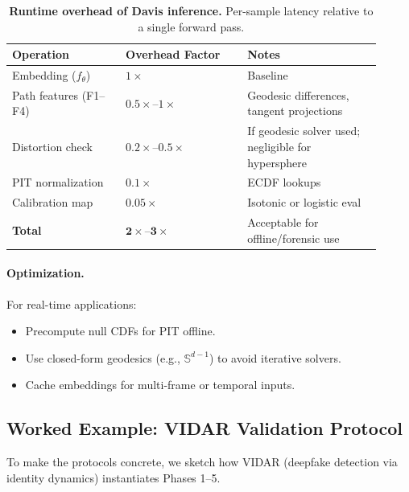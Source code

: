 \documentclass[11pt]{article}
\theoremstyle{remark}
\theoremstyle{plain}
\begin{document}
\begin{table}[H]
\centering
\caption{\textbf{Runtime overhead of Davis inference.} Per-sample latency relative to a single forward pass.}
\label{tab:inference-costs}
\begin{tabularx}{\linewidth}{@{}p{0.28\linewidth}p{0.30\linewidth}p{0.33\linewidth}@{}}
\toprule
\textbf{Operation} & \textbf{Overhead Factor} & \textbf{Notes} \\
\midrule
Embedding ($f_\theta$) & $1\times$ & Baseline \\
Path features (F1--F4) & $0.5\times$--$1\times$ & Geodesic differences, tangent projections \\
Distortion check & $0.2\times$--$0.5\times$ & If geodesic solver used; negligible for hypersphere \\
PIT normalization & $0.1\times$ & ECDF lookups \\
Calibration map & $0.05\times$ & Isotonic or logistic eval \\
\midrule
\textbf{Total} & $\mathbf{2\times}$--$\mathbf{3\times}$ & Acceptable for offline/forensic use \\
\bottomrule
\end{tabularx}
\end{table}

\paragraph{Optimization.}
For real-time applications:
\begin{itemize}[leftmargin=*]
  \item Precompute null CDFs for PIT offline.
  \item Use closed-form geodesics (e.g., $\mathbb{S}^{d-1}$) to avoid iterative solvers.
  \item Cache embeddings for multi-frame or temporal inputs.
\end{itemize}

\subsection{Worked Example: VIDAR Validation Protocol}
\label{subsec:vidar-example}

To make the protocols concrete, we sketch how VIDAR (deepfake detection via identity dynamics) instantiates Phases 1--5.
\end{document}
